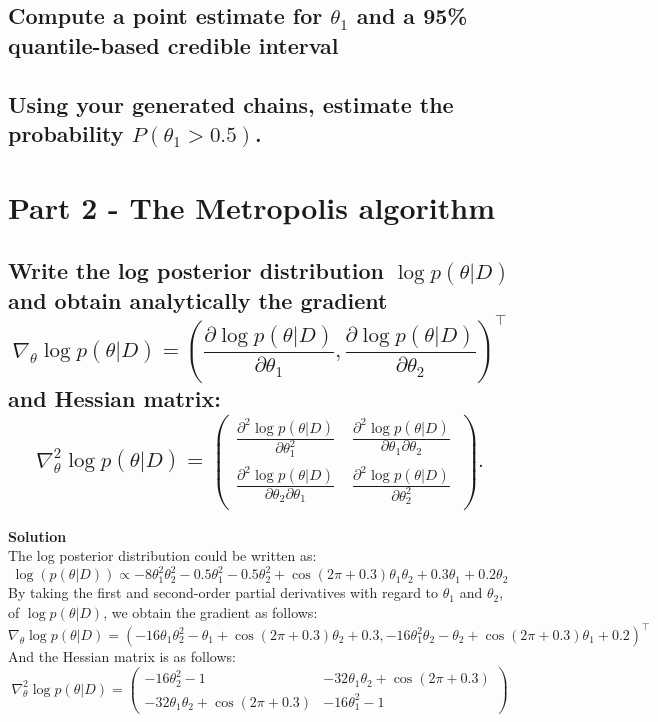\documentclass[12pt]{article}
\begin{document}
\subsection{Compute a point estimate for $\theta_1$ and a 95\% quantile-based credible interval}

\subsection{Using your generated chains, estimate the probability $P(\theta_1 > 0.5)$.}



\section{Part 2 - The Metropolis algorithm}
\subsection{Write the log posterior distribution \( \log p(\theta|D) \) and obtain analytically the gradient
\[\nabla_\theta \log p(\theta|D) = \left( \frac{\partial \log p(\theta|D)}{\partial \theta_1}, \frac{\partial \log p(\theta|D)}{\partial \theta_2} \right)^\top \]
and Hessian matrix:
\[\nabla^2_\theta \log p(\theta|D) = 
\begin{pmatrix}
\frac{\partial^2 \log p(\theta|D)}{\partial \theta_1^2} & \frac{\partial^2 \log p(\theta|D)}{\partial \theta_1 \partial \theta_2} \\
\frac{\partial^2 \log p(\theta|D)}{\partial \theta_2 \partial \theta_1} & \frac{\partial^2 \log p(\theta|D)}{\partial \theta_2^2} 
\end{pmatrix}.\]}
\textbf{Solution}\\
The log posterior distribution could be written as:
\[
\log(p(\theta|D)) \propto -8\theta_1^2\theta_2^2 - 0.5\theta_1^2 - 0.5\theta_2^2 + \cos(2\pi + 0.3)\theta_1\theta_2 + 0.3\theta_1 + 0.2\theta_2
\]
By taking the first and second-order partial derivatives with regard to \(\theta_1\) and \(\theta_2\), of \(\log p(\theta|D)\),
we obtain the gradient as follows:
\[
\nabla_\theta \log p(\theta|D) = \left( -16\theta_1\theta_2^2 - \theta_1 + \cos(2\pi + 0.3)\theta_2 + 0.3, -16\theta_1^2\theta_2 - \theta_2 + \cos(2\pi + 0.3)\theta_1 + 0.2 \right)^\top
\]
And the Hessian matrix is as follows:
\[
\nabla^2_\theta \log p(\theta|D) = 
\begin{pmatrix}
-16\theta_2^2 - 1 & -32\theta_1\theta_2 + \cos(2\pi + 0.3) \\
-32\theta_1\theta_2 + \cos(2\pi + 0.3) & -16\theta_1^2 - 1
\end{pmatrix}
\]
\end{document}
